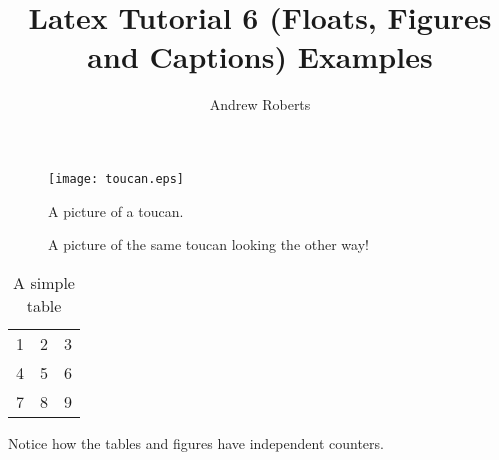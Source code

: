 \documentclass[english]{article}
\begin{document}
\title{Latex Tutorial 6 (Floats, Figures and Captions) Examples}
\author{Andrew Roberts}
\maketitle

\begin{figure}[!htp]
  \caption{A picture of a toucan.}
  \begin{center}
    \texttt{[image: toucan.eps]}
  \end{center}
\end{figure}

\begin{figure}[hbp]
  \begin{center}
  \end{center}
  \caption{A picture of the same toucan looking the other way!}
\end{figure}

\begin{table}[htp]
  \begin{center}
    \begin{tabular}{| l c r |}
    \hline
    1 & 2 & 3 \\
    4 & 5 & 6 \\
    7 & 8 & 9 \\
    \hline
    \end{tabular}
  \end{center}
  \caption{A simple table}
\end{table}

Notice how the tables and figures have independent counters.
\end{document}
